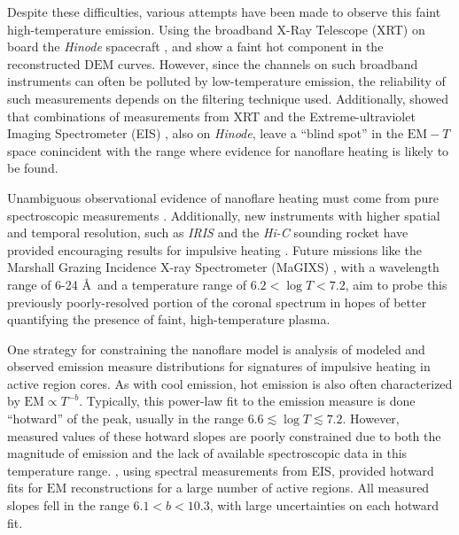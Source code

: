 \documentclass[apj]{emulateapj}
\newcommand{\ang}{\AA~}
\begin{document}
	\par Despite these difficulties, various attempts have been made to observe this faint high-temperature emission. Using the broadband X-Ray Telescope (XRT) \citep{golub_x-ray_2007} on board the \textit{Hinode} spacecraft \citep{kosugi_hinode_2007}, \citet{schmelz_hinode_2009} and \citet{reale_evidence_2009} show a faint hot component in the reconstructed $\mathrm{DEM}$ curves. However, since the channels on such broadband instruments can often be polluted by low-temperature emission, the reliability of such measurements depends on the filtering technique used. Additionally, \citet{winebarger_defining_2012} showed that combinations of measurements from XRT and the Extreme-ultraviolet Imaging Spectrometer (EIS) \citep{culhane_euv_2007}, also on  \textit{Hinode}, leave a ``blind spot'' in the $\mathrm{EM}-T$ space conincident with the range where evidence for nanoflare heating is likely to be found. 
	\par Unambiguous observational evidence of nanoflare heating must come from pure spectroscopic measurements \citep[see][]{brosius_pervasive_2014}. Additionally, new instruments with higher spatial and temporal resolution, such as \textit{IRIS} \citep{de_pontieu_interface_2014} and the \textit{Hi-C} sounding rocket \citep{cirtain_energy_2013} have provided encouraging results for impulsive heating \citep{testa_observing_2013,testa_evidence_2014}. Future missions like the Marshall Grazing Incidence X-ray Spectrometer (MaGIXS) \citep{kobayashi_marshall_2011,winebarger_new_2014}, with a wavelength range of 6-24 \ang and a temperature range of $6.2<\log{T}<7.2$, aim to probe this previously poorly-resolved portion of the coronal spectrum in hopes of better quantifying the presence of faint, high-temperature plasma.
	\par One strategy for constraining the nanoflare model is analysis of modeled and observed emission measure distributions for signatures of impulsive heating in active region cores. As with cool emission, hot emission is also often characterized by $\mathrm{EM}\propto T^{-b}$. Typically, this power-law fit to the emission measure is done ``hotward'' of the peak, usually in the range $6.6\lesssim\log{T}\lesssim7.2$. However, measured values of these hotward slopes are poorly constrained due to both the magnitude of emission and the lack of available spectroscopic data in this temperature range. \citet{warren_systematic_2012}, using spectral measurements from EIS, provided hotward fits for $\mathrm{EM}$ reconstructions for a large number of active regions. All measured slopes fell in the range $6.1<b<10.3$, with large uncertainties on each hotward fit.
\end{document}
